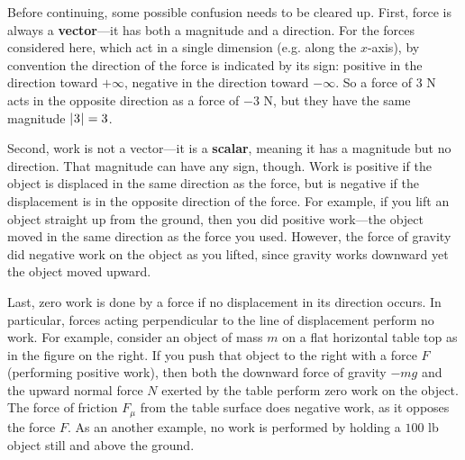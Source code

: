 \newpage
Before continuing, some possible confusion needs to be cleared up. First, force
is always a \textbf{vector}---it has both a magnitude and a direction. For the
forces considered here, which act in a single dimension (e.g. along the
$x$-axis), by convention the direction of the force is indicated by its sign:
positive in the direction toward $+\infty$, negative in the direction toward
$-\infty$. So a force of $3$ N acts in the opposite direction as a force of $-3$
N, but they have the same magnitude $\lvert\mspace{1mu}3\mspace{1mu}\rvert=3$.

Second, work is not a vector---it is a \textbf{scalar}, meaning it has a
magnitude but no direction. That magnitude can have any sign, though. Work is
positive if the object is displaced in the same direction as the force, but is
negative if the displacement is in the opposite direction of the force. For
example, if you lift an object straight up from the ground, then you did
positive work---the object moved in the same direction as the force you used.
However, the force of gravity did negative work on the object as you lifted,
since gravity works downward yet the object moved upward.

Last, zero work is done by a force if no displacement in its direction occurs.
In particular, forces acting perpendicular to the line of displacement perform
no work. For example, consider an object of mass $m$ on a flat horizontal table
top as in the figure on the right. If you push that object to the right with a
force $F$ (performing positive work), then both the downward force of gravity
$-mg$ and the upward normal force $N$ exerted by the table perform zero work on
the object. The force of friction $F_{\mu}$ from the table surface does negative
work, as it opposes the force $F$. As an another example, no work is performed
by holding a $100$ lb object still and above the ground.


